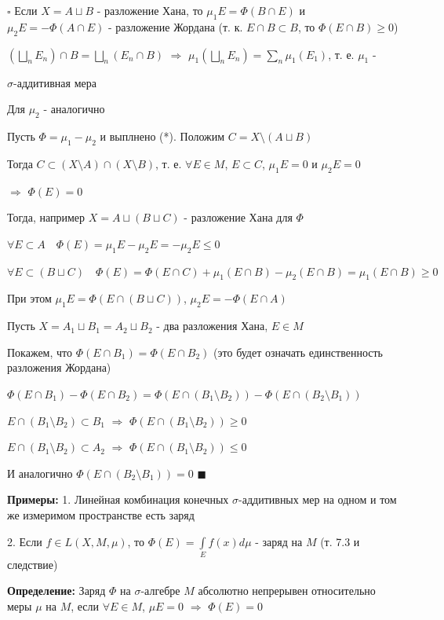 \documentclass[a4paper]{report}
\begin{document}
\noindent $\square$ Если $X=A\sqcup B$ - разложение Хана, то $\mu_1 E=\Phi(B\cap E)$ и $\mu_2E=-\Phi(A\cap E)$ - разложение Жордана (т. к. $E\cap B\subset B$, то $\Phi(E\cap B)\ge0$)

$\left(\bigsqcup\limits_n E_n\right)\cap B=\bigsqcup\limits_n(E_n\cap B)$ $\Rightarrow$ $\mu_1\left(\bigsqcup\limits_n E_n\right)=\sum\limits_n\mu_1(E_1)$, т. е.
$\mu_1$ -

\noindent$\sigma$-аддитивная мера

Для $\mu_2$ - аналогично

Пусть $\Phi=\mu_1-\mu_2$ и выплнено (*). Положим $C=X\setminus(A\sqcup B)$

Тогда $C\subset(X\setminus A)\cap(X\setminus B)$, т. е. $\forall E\in M$, $E\subset C$, $\mu_1 E=0$ и $\mu_2 E=0$

\noindent$\Rightarrow$ $\Phi(E)=0$

Тогда, например $X=A\sqcup(B\sqcup C)$ - разложение Хана для $\Phi$

$\forall E\subset A\quad\Phi(E)=\mu_1E-\mu_2E=-\mu_2E\le0$

$\forall E\subset(B\sqcup C)\quad\Phi(E)=\Phi(E\cap C)+\mu_1(E\cap B)-\mu_2(E\cap B)=\mu_1(E\cap B)\ge0$

При этом $\mu_1 E=\Phi\left(E\cap(B\sqcup C)\right)$, $\mu_2E=-\Phi(E\cap A)$

Пусть $X=A_1\sqcup B_1=A_2\sqcup B_2$ - два разложения Хана, $E\in M$

Покажем, что $\Phi(E\cap B_1)=\Phi(E\cap B_2)$ (это будет означать единственность разложения Жордана)

$\Phi(E\cap B_1)-\Phi(E\cap B_2)=\Phi(E\cap(B_1\setminus B_2))-\Phi(E\cap(B_2\setminus B_1))$

$E\cap(B_1\setminus B_2)\subset B_1$ $\Rightarrow$ $\Phi(E\cap(B_1\setminus B_2))\ge0$

$E\cap(B_1\setminus B_2)\subset A_2$ $\Rightarrow$ $\Phi(E\cap(B_1\setminus B_2))\le0$

И аналогично $\Phi(E\cap(B_2\setminus B_1))=0$ $\blacksquare$
\bigskip

\noindent\textbf{Примеры:} 1. Линейная комбинация конечных $\sigma$-аддитивных мер на одном и том же измеримом пространстве есть заряд

2. Если $f\in L(X,M,\mu)$, то $\Phi(E)=\displaystyle\int\limits_E f(x)d\mu$ - заряд на $M$ (т. 7.3 и следствие)
\bigskip

\noindent\textbf{Определение:} Заряд $\Phi$ на $\sigma$-алгебре $M$ абсолютно непрерывен относительно меры $\mu$ на $M$, если $\forall E\in M$, $\mu E=0$ $\Rightarrow$ $\Phi(E)=0$
\bigskip
\end{document}
